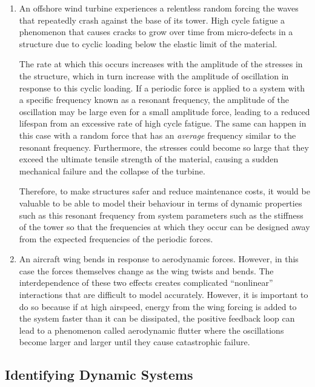 \documentclass[12pt]{article}
\begin{document}
\begin{enumerate}[listparindent=\parindent]
        \item An offshore wind turbine experiences a relentless random forcing the waves that repeatedly crash against the base of its tower.
        High cycle fatigue a phenomenon that causes cracks to grow over time from micro-defects in a structure due to cyclic loading below the elastic limit of the material.

        The rate at which this occurs increases with the amplitude of the stresses in the structure, which in turn increase with the amplitude of oscillation in response to this cyclic loading.
        If a periodic force is applied to a system with a specific frequency known as a resonant frequency, the amplitude of the oscillation may be large even for a small amplitude force, leading to a reduced lifespan from an excessive rate of high cycle fatigue.
        The same can happen in this case with a random force that has an \textit{average} frequency similar to the resonant frequency.
        Furthermore, the stresses could become so large that they exceed the ultimate tensile strength of the material, causing a sudden mechanical failure and the collapse of the turbine.

        Therefore, to make structures safer and reduce maintenance costs, it would be valuable to be able to model their behaviour in terms of dynamic properties such as this resonant frequency from system parameters such as the stiffness of the tower so that the frequencies at which they occur can be designed away from the expected frequencies of the periodic forces.

        \item An aircraft wing bends in response to aerodynamic forces.
        However, in this case the forces themselves change as the wing twists and bends.
        The interdependence of these two effects creates complicated ``nonlinear'' interactions that are difficult to model accurately.
        However, it is important to do so because if at high airspeed, energy from the wing forcing is added to the system faster than it can be dissipated, the positive feedback loop can lead to a phenomenon called aerodynamic flutter where the oscillations become larger and larger until they cause catastrophic failure.
    \end{enumerate}

    \subsection{Identifying Dynamic Systems}
\end{document}
